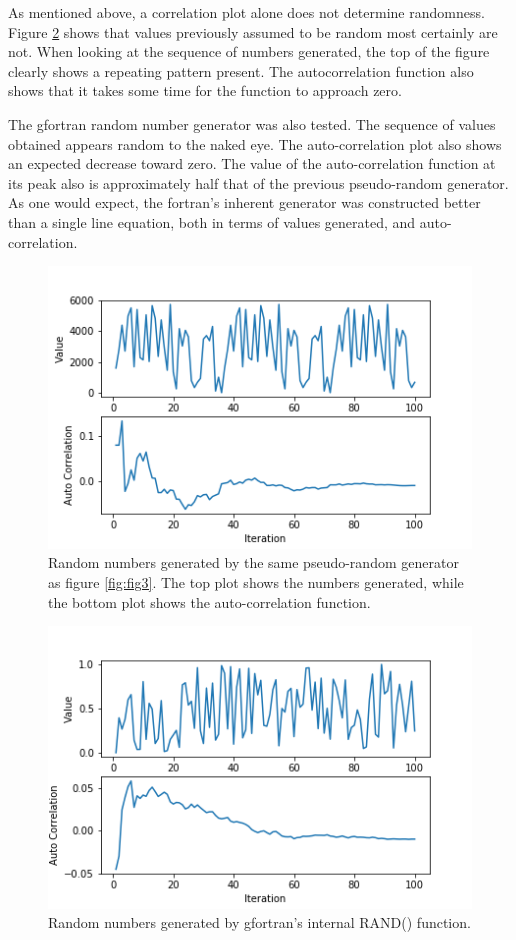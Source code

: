 \documentclass[twocolumn]{article}
\begin{document}
As mentioned above, a correlation plot alone does not determine randomness. Figure \ref{fig:fig4} shows that values previously assumed to be random most certainly are not. When looking at the sequence of numbers generated, the top of the figure clearly shows a repeating pattern present. The autocorrelation function also shows that it takes some time for the function to approach zero. 

The gfortran random number generator was also tested. The sequence of values obtained appears random to the naked eye. The auto-correlation plot also shows an expected decrease toward zero. The value of the auto-correlation function at its peak also is approximately half that of the previous pseudo-random generator. As one would expect, the fortran's inherent generator was constructed better than a single line equation, both in terms of values generated, and auto-correlation.

\begin{figure}
\centering
\includegraphics[width=\linewidth]{fig4}
\caption{Random numbers generated by the same pseudo-random generator as figure \ref{fig:fig3}. The top plot shows the numbers generated, while the bottom plot shows the auto-correlation function.}
\label{fig:fig4}
\end{figure}

\begin{figure}
	\centering
	\includegraphics[width=\linewidth]{fig5}
	\caption{Random numbers generated by gfortran's internal RAND() function.}
	\label{fig:fig4}
\end{figure}
\end{document}
